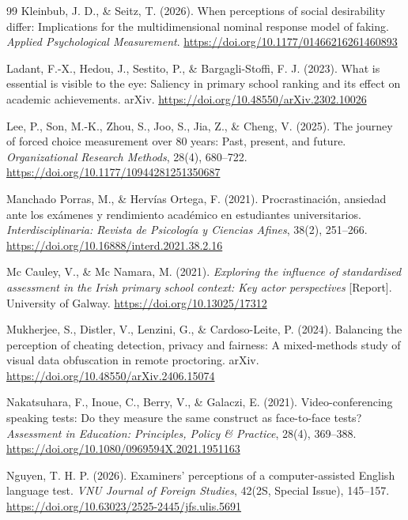 \documentclass[11pt]{article}
\begin{document}
\begin{thebibliography}{99}
Kleinbub, J. D., \& Seitz, T. (2026). When perceptions of social desirability differ: Implications for the multidimensional nominal response model of faking. \textit{Applied Psychological Measurement}. \url{https://doi.org/10.1177/01466216261460893}

Ladant, F.-X., Hedou, J., Sestito, P., \& Bargagli-Stoffi, F. J. (2023). What is essential is visible to the eye: Saliency in primary school ranking and its effect on academic achievements. arXiv. \url{https://doi.org/10.48550/arXiv.2302.10026}

Lee, P., Son, M.-K., Zhou, S., Joo, S., Jia, Z., \& Cheng, V. (2025). The journey of forced choice measurement over 80 years: Past, present, and future. \textit{Organizational Research Methods}, 28(4), 680--722. \url{https://doi.org/10.1177/10944281251350687}

Manchado Porras, M., \& Herv\'ias Ortega, F. (2021). Procrastinaci\'on, ansiedad ante los ex\'amenes y rendimiento acad\'emico en estudiantes universitarios. \textit{Interdisciplinaria: Revista de Psicolog\'ia y Ciencias Afines}, 38(2), 251--266. \url{https://doi.org/10.16888/interd.2021.38.2.16}

Mc Cauley, V., \& Mc Namara, M. (2021). \textit{Exploring the influence of standardised assessment in the Irish primary school context: Key actor perspectives} [Report]. University of Galway. \url{https://doi.org/10.13025/17312}

Mukherjee, S., Distler, V., Lenzini, G., \& Cardoso-Leite, P. (2024). Balancing the perception of cheating detection, privacy and fairness: A mixed-methods study of visual data obfuscation in remote proctoring. arXiv. \url{https://doi.org/10.48550/arXiv.2406.15074}

Nakatsuhara, F., Inoue, C., Berry, V., \& Galaczi, E. (2021). Video-conferencing speaking tests: Do they measure the same construct as face-to-face tests? \textit{Assessment in Education: Principles, Policy \& Practice}, 28(4), 369--388. \url{https://doi.org/10.1080/0969594X.2021.1951163}

Nguyen, T. H. P. (2026). Examiners' perceptions of a computer-assisted English language test. \textit{VNU Journal of Foreign Studies}, 42(2S, Special Issue), 145--157. \url{https://doi.org/10.63023/2525-2445/jfs.ulis.5691}


\end{thebibliography}
\end{document}
